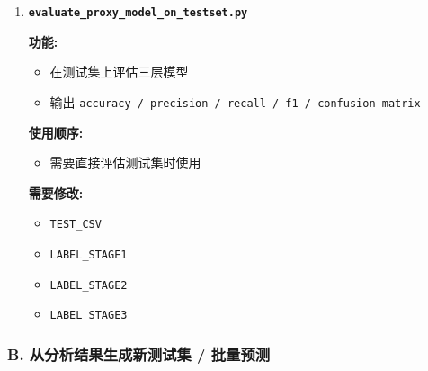 \documentclass[lang=cn,scheme=chinese,color=blue,device=normal,toc=onecol,math=cm]{elegantbook}
\begin{document}
\begin{enumerate}
\textbf{使用顺序:}\par
 
\begin{itemize}
\item 在批量预测之后使用
\end{itemize}
 
\textbf{需要修改:}\par
 
\begin{itemize}
\item \texttt{INPUT\_\allowbreak{}PRED\_\allowbreak{}CSV}
\item \texttt{OUTPUT\_\allowbreak{}JOINT\_\allowbreak{}CSV}
\item 各种 \texttt{threshold}(如需要)
\end{itemize}
\item \textbf{\texttt{evaluate\_\allowbreak{}proxy\_\allowbreak{}model\_\allowbreak{}on\_\allowbreak{}testset.py}}\par
 
\textbf{功能:}\par
 
\begin{itemize}
\item 在测试集上评估三层模型
\item 输出 \texttt{accuracy /\allowbreak{} precision /\allowbreak{} recall /\allowbreak{} f1 /\allowbreak{} confusion matrix}
\end{itemize}
 
\textbf{使用顺序:}\par
 
\begin{itemize}
\item 需要直接评估测试集时使用
\end{itemize}
 
\textbf{需要修改:}\par
 
\begin{itemize}
\item \texttt{TEST\_\allowbreak{}CSV}
\item \texttt{LABEL\_\allowbreak{}STAGE1}
\item \texttt{LABEL\_\allowbreak{}STAGE2}
\item \texttt{LABEL\_\allowbreak{}STAGE3}
\end{itemize}
\end{enumerate}


\subsubsection{B. 从分析结果生成新测试集 /\allowbreak{} 批量预测}
\end{document}
